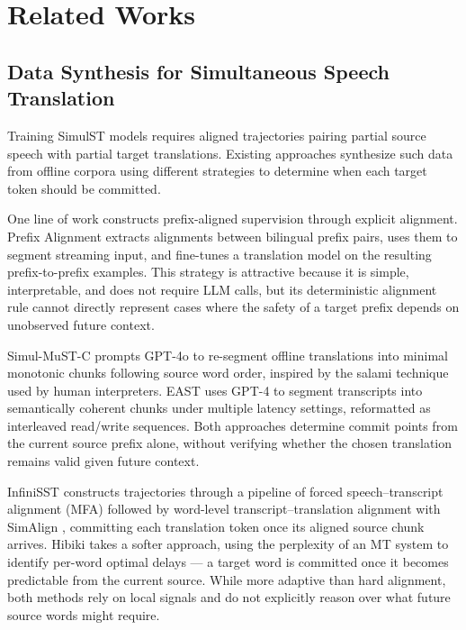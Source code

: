 \section{Related Works}

\subsection{Data Synthesis for Simultaneous Speech Translation}

Training SimulST models requires aligned trajectories pairing partial
source speech with partial target translations. Existing approaches
synthesize such data from offline corpora using different strategies to
determine when each target token should be committed.

One line of work constructs prefix-aligned supervision through explicit
alignment. Prefix Alignment \citep{kano-etal-2022-simultaneous} extracts
alignments between bilingual prefix pairs, uses them to segment streaming
input, and fine-tunes a translation model on the resulting prefix-to-prefix
examples. This strategy is attractive because it is simple, interpretable, and
does not require LLM calls, but its deterministic alignment rule cannot
directly represent cases where the safety of a target prefix depends on
unobserved future context.

Simul-MuST-C \citep{Simul-must-c} prompts GPT-4o to re-segment offline
translations into minimal monotonic chunks following source word order,
inspired by the salami technique used by human interpreters.
EAST \citep{EAST} uses GPT-4 to segment transcripts into semantically
coherent chunks under multiple latency settings, reformatted as
interleaved read/write sequences. Both approaches determine commit points
from the current source prefix alone, without verifying whether the
chosen translation remains valid given future context.

InfiniSST \citep{ouyang2025infinisst} constructs trajectories through a
pipeline of forced speech--transcript alignment (MFA) followed by
word-level transcript--translation alignment with SimAlign
\citep{jalili-sabet-etal-2020-simalign}, committing each translation
token once its aligned source chunk arrives. Hibiki takes a softer
approach, using the perplexity of an MT system to identify per-word
optimal delays --- a target word is committed once it becomes predictable
from the current source. While more adaptive than hard alignment, both
methods rely on local signals and do not explicitly reason over what
future source words might require.

